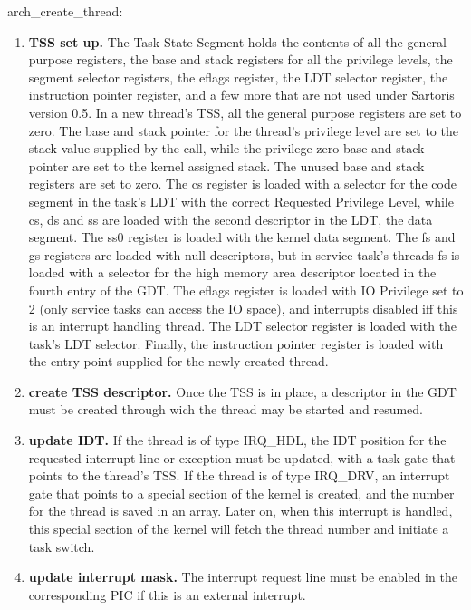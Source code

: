 \documentclass[11pt, letterpaper, twoside, english]{book}
\begin{document}
\textsf{arch\_create\_thread}: 
\begin{enumerate}
\item[]\textbf{TSS set up.} The Task State Segment holds the contents of all the general purpose registers, the base and stack registers for all the privilege levels, the segment selector registers, the eflags register, the LDT selector register, the instruction pointer register, and a few more that are not used under Sartoris version 0.5. In a new thread's TSS, all the general purpose registers are set to zero. The base and stack pointer for the thread's privilege level are set to the stack value supplied by the call, while the privilege zero base and stack pointer are set to the kernel assigned stack. The unused base and stack registers are set to zero. The cs register is loaded with a selector for the code segment in the task's LDT with the correct Requested Privilege Level, while cs, ds and ss are loaded with the second descriptor in the LDT, the data segment. The ss0 register is loaded with the kernel data segment. The fs and gs registers are loaded with null descriptors, but in service task's threads fs is loaded with a selector for the high memory area descriptor located in the fourth entry of the GDT. The eflags register is loaded with IO Privilege set to 2 (only service tasks can access the IO space), and interrupts disabled iff this is an interrupt handling thread. The LDT selector register is loaded with the task's LDT selector. Finally, the instruction pointer register is loaded with the entry point supplied for the newly created thread.
\item[]\textbf{create TSS descriptor.} Once the TSS is in place, a descriptor in the GDT must be created through wich the thread may be started and resumed.
\item[]\textbf{update IDT.} If the thread is of type \textsf{IRQ\_HDL}, the IDT position for the requested interrupt line or exception must be updated, with a task gate that points to the thread's TSS. If the thread is of type \textsf{IRQ\_DRV}, an interrupt gate that points to a special section of the kernel is created, and the number for the thread is saved in an array. Later on, when this interrupt is handled, this special section of the kernel will fetch the thread number and initiate a task switch. 
\item[]\textbf{update interrupt mask.} The interrupt request line must be enabled in the corresponding PIC if this is an external interrupt.
\end{enumerate}
\end{document}
